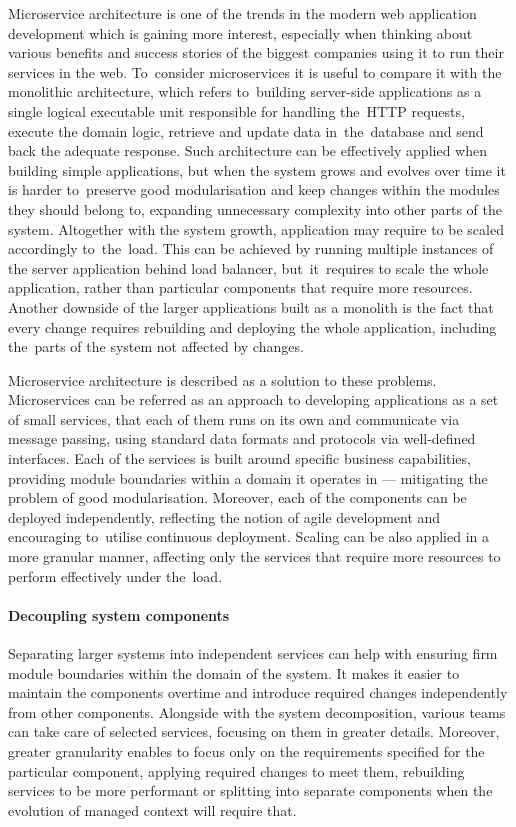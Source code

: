Microservice architecture is one of the trends in the modern web application development which is gaining more interest, especially when thinking about various benefits and success stories of the biggest companies using it to run their services in the web. To~consider microservices it is useful to compare it with the monolithic architecture, which refers to~building server-side applications as a single logical executable unit responsible for handling the~HTTP requests, execute the domain logic, retrieve and update data in~the~database and send back the adequate response. Such architecture can be effectively applied when building simple applications, but when the system grows and evolves over time it is harder to~preserve good modularisation and keep changes within the modules they should belong to, expanding unnecessary complexity into other parts of the system. Altogether with the system growth, application may require to be scaled accordingly to~the~load. This can be achieved by running multiple instances of the server application behind load balancer, but~it~requires to scale the whole application, rather than particular components that require more resources. Another downside of the larger applications built as a monolith is the fact that every change requires rebuilding and deploying the whole application, including the~parts of the system not affected by changes.

Microservice architecture \cite{FowlerMicroservices} is described as a solution to these problems. Microservices can be referred as an approach to developing applications as a set of small services, that each of them runs on its own and communicate via message passing, using standard data formats and protocols via well-defined interfaces. Each of the services is built around specific business capabilities, providing module boundaries within a domain it operates in --- mitigating the problem of good modularisation. Moreover, each of the components can be deployed independently, reflecting the notion of agile development and encouraging to~utilise continuous deployment. Scaling can be also applied in a more granular manner, affecting only the services that require more resources to perform effectively under the~load.

\paragraph{Decoupling system components}

Separating larger systems into independent services can help with ensuring firm module boundaries within the domain of the system. It makes it easier to maintain the components overtime and introduce required changes independently from other components. Alongside with the system decomposition, various teams can take care of selected services, focusing on them in greater details. Moreover, greater granularity enables to focus only on the requirements specified for the particular component, applying required changes to meet them, rebuilding services to be more performant or splitting into separate components when the evolution of managed context will require that.

